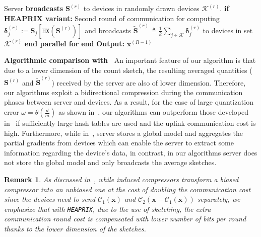 \documentclass[sigconf, anonymous, review]{acmart}
\newtheorem{remark}{Remark}
\begin{document}
\begin{algorithm}[t]
\begin{algorithmic}[1]
\STATE \quad Server \textbf{broadcasts} ${\mathbf{S}}^{(r)}$ to devices in randomly drawn devices $\mathcal{K}^{(r)}$.
\vspace{0.1cm}
\STATE \quad \textbf{if HEAPRIX variant:} \label{line:heaprix2}
\STATE \qquad Second round of communication for computing $\mathbf{\delta}_j^{(r)} :=  \mathbf{S}_j\left[\texttt{HX}(\mathbf{S}^{(r)})\right]$ and broadcasts $\tilde{\mathbf{S}}^{(r)}\triangleq\frac{1}{k}\sum_{j\in\mathcal{K}}\mathbf{\delta}_j^{(r)}$ to devices in set $\mathcal{K}^{(r)}$
\vspace{0.1cm}
\STATE \textbf{end parallel for}
\STATE \textbf{end}
\STATE \textbf{Output:} ${\boldsymbol{x}}^{(R-1)}$
\end{algorithmic}
\end{algorithm}

\vspace{0.05in}
\noindent\textbf{Algorithmic comparison  with~\citep{haddadpour2020federated}}
An important feature of our algorithm is that due to a lower dimension of the count sketch, the resulting averaged quantities ($\mathbf{S}^{(r)}$ and  $\tilde{\mathbf{S}}^{(r)}$) received by the server are also of lower dimension. 
Therefore, our algorithms exploit a bidirectional compression during the communication phases between server and devices. 
As a result, for the case of large quantization error $\omega=\theta(\frac{d}{m})$ as shown in~\citep{haddadpour2020federated}, our algorithms can outperform those developed in~\citep{haddadpour2020federated} if sufficiently large hash tables are used and the uplink communication cost is high. 
Furthermore, while in~\citep{haddadpour2020federated}, server stores a global model and aggregates the partial gradients from devices which can enable the server to extract some information regarding the device's data, in contrast, in our algorithms server does not store the global model and only broadcasts the average sketches. 

\begin{remark}
As discussed in~\citep{horvath2020better}, while induced compressors transform a biased compressor into an unbiased one at the cost of doubling the communication cost since the devices need to send $\mathcal{C}_1(\boldsymbol{x})$ and $\mathcal{C}_2\left(\boldsymbol{x}-\mathcal{C}_1\left(\boldsymbol{x}\right)\right)$ separately, we emphasize that with \texttt{HEAPRIX}, due to the use of sketching, the extra communication round cost is compensated with lower number of bits per round thanks to the lower dimension of the sketches.  
\end{remark}
\end{document}
